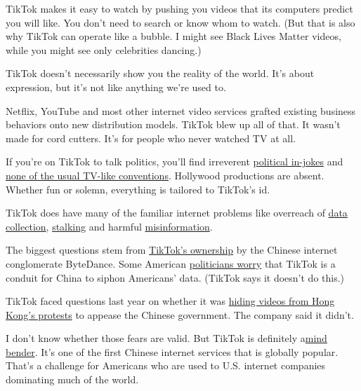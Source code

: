 TikTok makes it easy to watch by pushing you videos that its computers
predict you will like. You don't need to search or know whom to watch.
(But that is also why TikTok can operate like a bubble. I might see
Black Lives Matter videos, while you might see only celebrities
dancing.)

TikTok doesn't necessarily show you the reality of the world. It's about
expression, but it's not like anything we're used to.

Netflix, YouTube and most other internet video services grafted existing
business behaviors onto new distribution models. TikTok blew up all of
that. It wasn't made for cord cutters. It's for people who never watched
TV at all.

If you're on TikTok to talk politics, you'll find irreverent
\href{https://melmagazine.com/en-us/story/camp-pence-tiktok-memes-lgbtq-conversion-therapy}{political
in-jokes} and
\href{https://www.nytimes3xbfgragh.onion/2020/02/27/style/tiktok-politics-bernie-trump.html}{none
of the usual TV-like conventions}. Hollywood productions are absent.
Whether fun or solemn, everything is tailored to TikTok's id.

TikTok does have many of the familiar internet problems like overreach
of
\href{https://www.nytimes3xbfgragh.onion/2020/05/14/technology/tiktok-kids-privacy.html}{data
collection},
\href{https://www.latimes.com/local/lanow/la-me-ln-tik-tok-lewd-acts-arrest-20190214-story.html}{stalking}
and harmful
\href{https://www.mediamatters.org/fake-news/tiktok-hosting-videos-spreading-misinformation-about-coronavirus-despite-platforms-new}{misinformation}.

The biggest questions stem from
\href{https://www.nytimes3xbfgragh.onion/2019/11/18/technology/tiktok-alex-zhu-interview.html}{TikTok's
ownership} by the Chinese internet conglomerate ByteDance. Some American
\href{https://www.politico.com/newsletters/morning-tech/2020/05/28/house-democrats-join-gop-in-going-after-tiktok-787945}{politicians
worry} that TikTok is a conduit for China to siphon Americans' data.
(TikTok says it doesn't do this.)

TikTok faced questions last year on whether it was
\href{https://www.bloomberg.com/news/newsletters/2019-09-17/hong-kong-protests-raise-censorship-concerns-for-hot-app-tiktok?sref=7ooTCNG1}{hiding
videos from Hong Kong's protests} to appease the Chinese government. The
company said it didn't.

I don't know whether those fears are valid. But TikTok is definitely
a\href{https://www.nytimes3xbfgragh.onion/2019/11/05/business/tiktok-china-bytedance.html}{mind
bender}. It's one of the first Chinese internet services that is
globally popular. That's a challenge for Americans who are used to U.S.
internet companies dominating much of the world.

